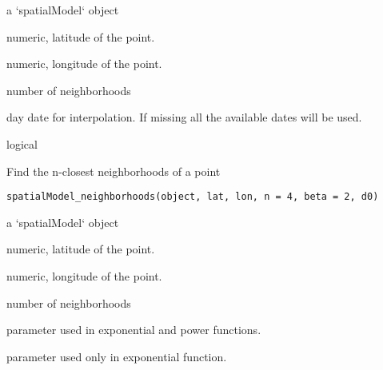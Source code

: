 \documentclass[a4paper]{book}
\begin{document}
%
\begin{Arguments}
\begin{ldescription}
\item[\code{object}] a `spatialModel` object

\item[\code{lat}] numeric, latitude of the point.

\item[\code{lon}] numeric, longitude of the point.

\item[\code{n}] number of neighborhoods

\item[\code{day\_date}] day date for interpolation. If missing all the available dates will be used.

\item[\code{quiet}] logical
\end{ldescription}
\end{Arguments}
%
\begin{Description}\relax
Find the n-closest neighborhoods of a point
\end{Description}
%
\begin{Usage}
\begin{verbatim}
spatialModel_neighborhoods(object, lat, lon, n = 4, beta = 2, d0)
\end{verbatim}
\end{Usage}
%
\begin{Arguments}
\begin{ldescription}
\item[\code{object}] a `spatialModel` object

\item[\code{lat}] numeric, latitude of the point.

\item[\code{lon}] numeric, longitude of the point.

\item[\code{n}] number of neighborhoods

\item[\code{beta}] parameter used in exponential and power functions.

\item[\code{d0}] parameter used only in exponential function.
\end{ldescription}
\end{Arguments}
\end{document}
